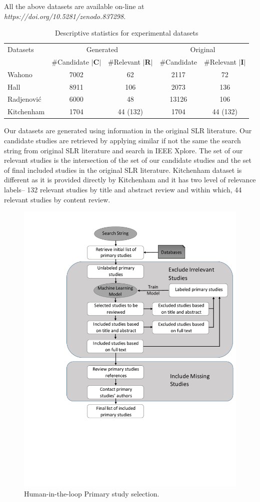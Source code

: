 \documentclass{svjour3}
\theoremstyle{break}
\begin{document}
All the above datasets are available on-line at {\em https://doi.org/10.5281/zenodo.837298}.

\begin{table}
\caption{Descriptive statistics for experimental datasets}
\label{tab: number}
\begin{center}
\begin{tabular}{ |l|c|c|c|c| }
  \hline
   Datasets & \multicolumn{2}{|c|}{Generated} & \multicolumn{2}{|c|}{Original} \\
  \cline{2-5}
  & \#Candidate $|$\textbf{C}$|$ & \#Relevant $|$\textbf{R}$|$& \#Candidate & \#Relevant $|$\textbf{I}$|$\\
  \hline
  Wahono & 7002 & 62 & 2117 & 72\\
  \hline
  Hall & 8911 & 106 & 2073 & 136 \\
  \hline
  Radjenovi{\'c} & 6000 & 48 & 13126 & 106\\
  \hline
  Kitchenham & 1704 & 44 (132) & 1704 & 44 (132) \\
  \hline
\end{tabular}
\end{center}
{\footnotesize Our datasets are generated using information in the original SLR literature. Our candidate studies are retrieved by applying similar if not the same the search string from original SLR literature and search in IEEE Xplore. The set of our relevant studies is the intersection of the set of our candidate studies and the set of final included studies in the original SLR literature. Kitchenham dataset is different as it is provided directly by Kitchenham and it has two level of relevance labels-- 132 relevant studies by title and abstract review and within which, 44 relevant studies by content review.}
\end{table}




\begin{figure}[t]
    \centering
    \includegraphics[width=0.6\linewidth]{Learning_based_primary_study_selection.pdf}
    \caption{Human-in-the-loop Primary study selection.}
    \label{fig: learning}
\end{figure}
\end{document}
